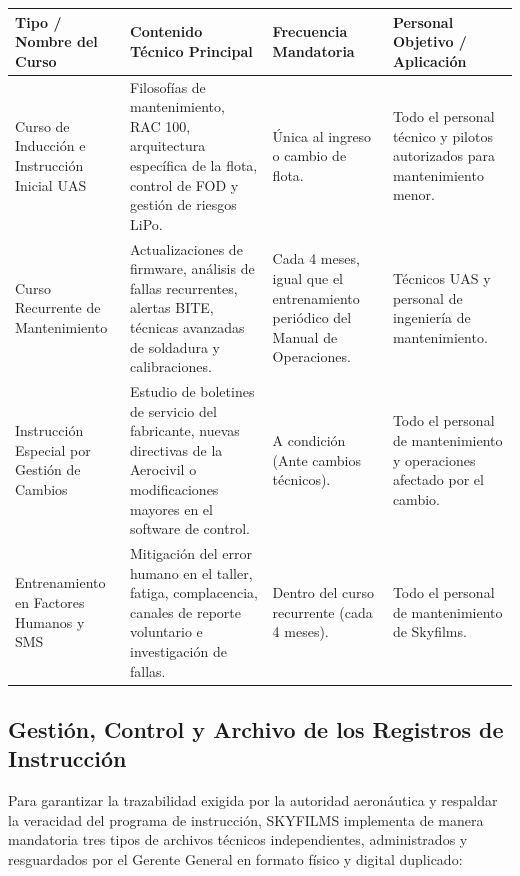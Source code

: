\vspace{0.3cm}
\begin{longtable}{|p{}|p{}|p{}|p{}|}
\hline
\rowcolor{gray!30}
\textbf{Tipo / Nombre del Curso} & \textbf{Contenido Técnico Principal} & \textbf{Frecuencia Mandatoria} & \textbf{Personal Objetivo / Aplicación} \\ \hline
\endhead

Curso de Inducción e Instrucción Inicial UAS & Filosofías de mantenimiento, RAC 100, arquitectura específica de la flota, control de FOD y gestión de riesgos LiPo. & Única al ingreso o cambio de flota. & Todo el personal técnico y pilotos autorizados para mantenimiento menor. \\ \hline

Curso Recurrente de Mantenimiento & Actualizaciones de firmware, análisis de fallas recurrentes, alertas BITE, técnicas avanzadas de soldadura y calibraciones. & Cada 4 meses, igual que el entrenamiento periódico del Manual de Operaciones. & Técnicos UAS y personal de ingeniería de mantenimiento. \\ \hline

Instrucción Especial por Gestión de Cambios & Estudio de boletines de servicio del fabricante, nuevas directivas de la Aerocivil o modificaciones mayores en el software de control. & A condición (Ante cambios técnicos). & Todo el personal de mantenimiento y operaciones afectado por el cambio. \\ \hline

Entrenamiento en Factores Humanos y SMS & Mitigación del error humano en el taller, fatiga, complacencia, canales de reporte voluntario e investigación de fallas. & Dentro del curso recurrente (cada 4 meses). & Todo el personal de mantenimiento de Skyfilms. \\ \hline
\end{longtable}
\vspace{0.3cm}

\subsection{Gestión, Control y Archivo de los Registros de Instrucción}
Para garantizar la trazabilidad exigida por la autoridad aeronáutica y respaldar la veracidad del programa de instrucción, SKYFILMS implementa de manera mandatoria tres tipos de archivos técnicos independientes, administrados y resguardados por el Gerente General en formato físico y digital duplicado:

